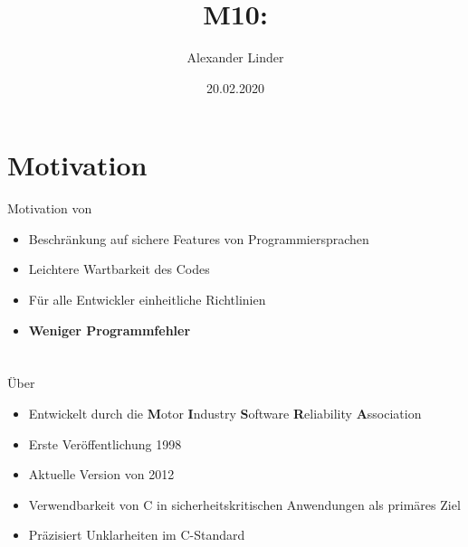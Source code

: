 \documentclass{beamer}
\title{M10: \sqss}
\author[Linder]{Alexander Linder}
\date{20.02.2020}
\institute{FAKULTÄT FÜR INFORMATIK}
\begin{document}

    \begin{frame}
        \maketitle
    \end{frame}

    \begin{frame}
        \tableofcontents
    \end{frame}

    \section{Motivation}
    \label{sec:motivation}
    \begin{frame}{Motivation von \sqss}
        \begin{itemize}
            \item Beschränkung auf sichere Features von Programmiersprachen
            \item Leichtere Wartbarkeit des Codes
            \item Für alle Entwickler einheitliche Richtlinien
            \pause
            \item \textbf{Weniger Programmfehler}
        \end{itemize}
    \end{frame}

    \section{\misra}
    \label{sec:misra-c}
    \begin{frame}{Über \misra}
        \begin{itemize}
            \item Entwickelt durch die \textbf{M}otor \textbf{I}ndustry \textbf{S}oftware \textbf{R}eliability \textbf{A}ssociation
            \item Erste Veröffentlichung 1998
            \item Aktuelle Version von 2012
            \item Verwendbarkeit von C in sicherheitskritischen Anwendungen als primäres Ziel
            \item Präzisiert Unklarheiten im C-Standard
        \end{itemize}
    \end{frame}
\end{document}
